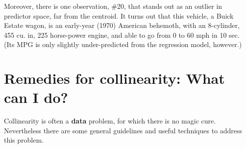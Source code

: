 \documentclass[
  letterpaper,
  10pt,
  krantz2]{krantz}
\begin{document}
Moreover, there is one observation, \#20, that stands out as an outlier
in predictor space, far from the centroid. It turns out that this
vehicle, a Buick Estate wagon, is an early-year (1970) American
behemoth, with an 8-cylinder, 455 cu. in, 225 horse-power engine, and
able to go from 0 to 60 mph in 10 sec. (Its MPG is only slightly
under-predicted from the regression model, however.)

\hypertarget{sec-remedies}{%
\section{Remedies for collinearity: What can I do?}\label{sec-remedies}}

Collinearity is often a \textbf{data} problem, for which there is no
magic cure. Nevertheless there are some general guidelines and useful
techniques to address this problem.
\end{document}
